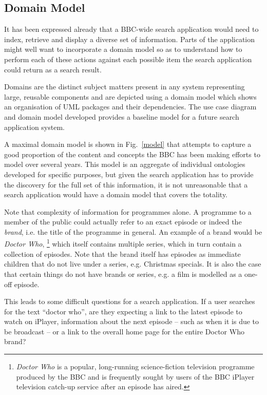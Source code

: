 \documentclass{llncs}
\begin{document}
\subsection{Domain Model}

It has been expressed already that a BBC-wide search application
would need to index, retrieve and display a diverse set of
information. Parts of the application might well want to incorporate
a domain model\cite{fowler2002patterns} so as to understand how
to perform each of these actions against each possible item
the search application could return as a search result.

Domains are the distinct subject matters present in any system
representing large, reusable components and are depicted using a
domain model which shows an organisation of UML packages and their
dependencies\cite{dickerson2009architecture}. The use case diagram and domain model
developed provides a baseline model for a future search application system.

A maximal
domain model is shown in Fig.~\ref{model} that attempts to capture
a good proportion of the content and concepts the BBC has
been making efforts to model over several years. This model is
an aggregate of individual ontologies developed for specific purposes,
but given the search application has to provide the discovery for
the full set of this information, it is not unreasonable that
a search application would have a domain model that covers the totality.

Note that complexity of information for programmes alone\cite{raimond2009bbc}.
A programme to a member of the public could actually refer to an
exact episode or indeed the \emph{brand}, i.e. the title of the programme
in general. An example of a brand would be
\emph{Doctor Who},
\footnote{\emph{Doctor Who} is a popular, long-running science-fiction
television programme produced by the BBC and is frequently sought by users
of the BBC iPlayer television catch-up service after an episode has aired.
} which itself contains multiple series, which in turn
contain a collection of episodes. Note that the brand itself has episodes
as immediate children that do not live under a series, e.g. Christmas specials.
It is also the case that certain things do not have brands or series, e.g.
a film is modelled as a one-off episode.

This leads to some difficult questions for a search application. If a user
searches for the text ``doctor who'',
are they expecting a link to the
latest episode to watch on iPlayer, information about the next episode
-- such as when it is due to be broadcast -- or a link to the overall
home page for the entire Doctor Who brand?
\end{document}
